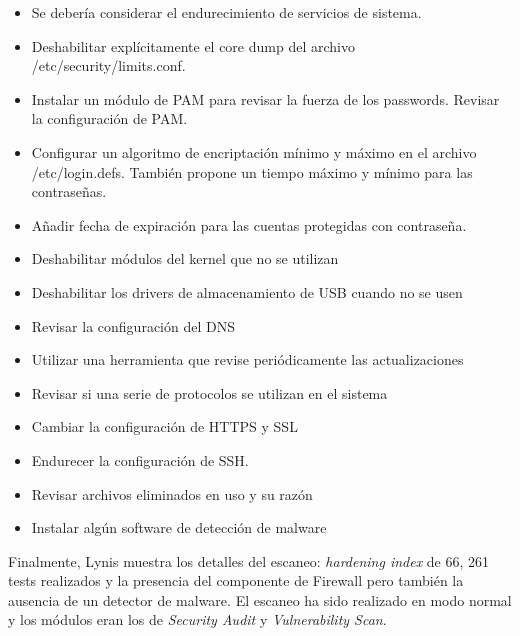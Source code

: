 \documentclass[10pt,a4paper]{article}
\begin{document}
\begin{enumerate}[label=\textbf{\alph*)}]
\begin{itemize}
\item Se debería considerar el endurecimiento de servicios de sistema.
\item Deshabilitar explícitamente el core dump del archivo /etc/security/limits.conf.
\item Instalar un módulo de PAM para revisar la fuerza de los passwords. Revisar la configuración de PAM.
\item Configurar un algoritmo de encriptación mínimo y máximo en el archivo /etc/login.defs. También propone un tiempo máximo y mínimo para las contraseñas.
\item Añadir fecha de expiración para las cuentas protegidas con contraseña.
\item Deshabilitar módulos del kernel que no se utilizan
\item Deshabilitar los drivers de almacenamiento de USB cuando no se usen
\item Revisar la configuración del DNS
\item Utilizar una herramienta que revise periódicamente las actualizaciones
\item Revisar si una serie de protocolos se utilizan en el sistema
\item Cambiar la configuración de HTTPS y SSL
\item Endurecer la configuración de SSH.
\item Revisar archivos eliminados en uso y su razón
\item Instalar algún software de detección de malware
\end{itemize}


Finalmente, Lynis muestra los detalles del escaneo: \textit{hardening index} de 66, 261 tests realizados y la presencia del componente de Firewall pero también la ausencia de un detector de malware. El escaneo ha sido realizado en modo normal y los módulos eran los de \textit{Security Audit} y \textit{Vulnerability Scan}.

\end{enumerate}
\end{document}
